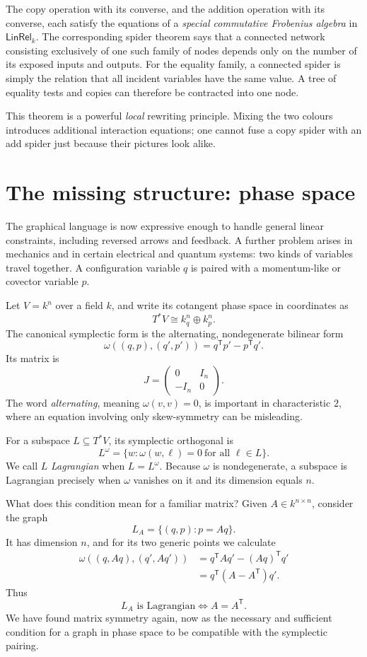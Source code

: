 The copy operation with its converse, and the addition operation with its converse, each satisfy the equations of a \emph{special commutative Frobenius algebra} in \(\mathsf{LinRel}_k\). The corresponding spider theorem says that a connected network consisting exclusively of one such family of nodes depends only on the number of its exposed inputs and outputs. For the equality family, a connected spider is simply the relation that all incident variables have the same value. A tree of equality tests and copies can therefore be contracted into one node.

This theorem is a powerful \emph{local} rewriting principle. Mixing the two colours introduces additional interaction equations; one cannot fuse a copy spider with an add spider just because their pictures look alike.

\section{The missing structure: phase space}

The graphical language is now expressive enough to handle general linear constraints, including reversed arrows and feedback. A further problem arises in mechanics and in certain electrical and quantum systems: two kinds of variables travel together. A configuration variable \(q\) is paired with a momentum-like or covector variable \(p\).

Let \(V=k^n\) over a field \(k\), and write its cotangent phase space in coordinates as
\[
 T^*V\cong k^n_q\oplus k^n_p.
\]
The canonical symplectic form is the alternating, nondegenerate bilinear form
\[
 \boxed{\omega((q,p),(q',p'))
   =q^{\mathsf T}p'-p^{\mathsf T}q'.}
\]
Its matrix is
\[
 J=\begin{pmatrix}0&I_n\\-I_n&0\end{pmatrix}.
\]
The word \emph{alternating}, meaning \(\omega(v,v)=0\), is important in characteristic \(2\), where an equation involving only skew-symmetry can be misleading.

For a subspace \(L\subseteq T^*V\), its symplectic orthogonal is
\[
 L^\omega=\{w:\omega(w,\ell)=0\ \text{for all }\ell\in L\}.
\]
We call \(L\) \emph{Lagrangian} when \(L=L^\omega\). Because \(\omega\) is nondegenerate, a subspace is Lagrangian precisely when \(\omega\) vanishes on it and its dimension equals \(n\).

What does this condition mean for a familiar matrix? Given \(A\in k^{n\times n}\), consider the graph
\[
 L_A=\{(q,p):p=Aq\}.
\]
It has dimension \(n\), and for its two generic points we calculate
\[
 \begin{aligned}
 \omega((q,Aq),(q',Aq'))
 &=q^{\mathsf T}Aq'-(Aq)^{\mathsf T}q'\\
 &=q^{\mathsf T}(A-A^{\mathsf T})q'.
 \end{aligned}
\]
Thus
\[
 \boxed{L_A\text{ is Lagrangian}
        \Longleftrightarrow A=A^{\mathsf T}.}
\]
We have found matrix symmetry again, now as the necessary and sufficient condition for a graph in phase space to be compatible with the symplectic pairing.


